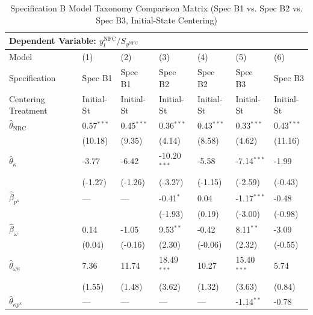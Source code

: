 \begin{landscape}
\begin{table}[H]
\centering
\caption{Specification B Model Taxonomy Comparison Matrix (Spec B1 vs. Spec B2 vs. Spec B3, Initial-State Centering)}
\label{tab:specB_spec_comparison}
\small
\begin{tabular}{p{5.0cm}p{1.8cm}p{1.8cm}p{1.8cm}p{1.8cm}p{1.8cm}p{1.8cm}}
\toprule
\multicolumn{7}{l}{\textbf{Dependent Variable: $y_t^{\text{NFC}} / S_{y^{\text{NFC}}}$}} \\
\midrule
Model & (1) & (2) & (3) & (4) & (5) & (6)  \\
Specification & Spec B1 & Spec B1 & Spec B2 & Spec B2 & Spec B3 & Spec B3  \\
Centering Treatment & Initial-St & Initial-St & Initial-St & Initial-St & Initial-St & Initial-St  \\
\midrule
$\hat{\theta}_{\text{NRC}}$ & 0.57$^{***}$ & 0.45$^{***}$ & 0.36$^{***}$ & 0.43$^{***}$ & 0.33$^{***}$ & 0.43$^{***}$  \\
 & {\scriptsize (10.18)} & {\scriptsize (9.35)} & {\scriptsize (4.14)} & {\scriptsize (8.58)} & {\scriptsize (4.62)} & {\scriptsize (11.16)}  \\
$\hat{\theta}_{\kappa}$ & -3.77 & -6.42 & -10.20$^{***}$ & -5.58 & -7.14$^{***}$ & -1.99  \\
 & {\scriptsize (-1.27)} & {\scriptsize (-1.26)} & {\scriptsize (-3.27)} & {\scriptsize (-1.15)} & {\scriptsize (-2.59)} & {\scriptsize (-0.43)}  \\
$\hat{\beta}_{p^{\kappa}}$ & --- & --- & -0.41$^{*}$ & 0.04 & -1.17$^{***}$ & -0.48  \\
 &  &  & {\scriptsize (-1.93)} & {\scriptsize (0.19)} & {\scriptsize (-3.00)} & {\scriptsize (-0.98)}  \\
$\hat{\beta}_{\omega}$ & 0.14 & -1.05 & 9.53$^{**}$ & -0.42 & 8.11$^{**}$ & -3.09  \\
 & {\scriptsize (0.04)} & {\scriptsize (-0.16)} & {\scriptsize (2.30)} & {\scriptsize (-0.06)} & {\scriptsize (2.32)} & {\scriptsize (-0.55)}  \\
$\hat{\theta}_{\omega \kappa}$ & 7.36 & 11.74 & 18.49$^{***}$ & 10.27 & 15.40$^{***}$ & 5.74  \\
 & {\scriptsize (1.55)} & {\scriptsize (1.48)} & {\scriptsize (3.62)} & {\scriptsize (1.32)} & {\scriptsize (3.63)} & {\scriptsize (0.84)}  \\
$\hat{\theta}_{\kappa p^{\kappa}}$ & --- & --- & --- & --- & -1.14$^{**}$ & -0.78  \\

\end{tabular}
\end{table}
\end{landscape}

